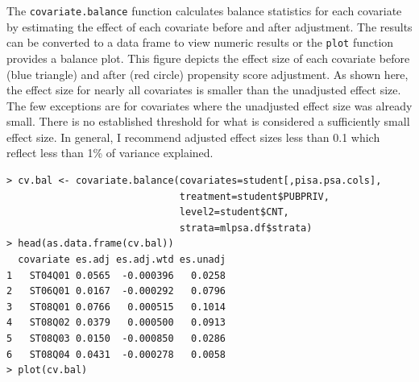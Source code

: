 \documentclass[letterpaper,12pt]{article} %
\begin{document}
The \texttt{covariate.balance} function calculates balance statistics for each covariate by estimating the effect of each covariate before and after adjustment. The results can be converted to a data frame to view numeric results or the \texttt{plot} function provides a balance plot. This figure depicts the effect size of each covariate before (blue triangle) and after (red circle) propensity score adjustment. As shown here, the effect size for nearly all covariates is smaller than the unadjusted effect size. The few exceptions are for covariates where the unadjusted effect size was already small. There is no established threshold for what is considered a sufficiently small effect size. In general, I recommend adjusted effect sizes less than 0.1 which reflect less than 1\% of variance explained.

\begin{verbatim}
> cv.bal <- covariate.balance(covariates=student[,pisa.psa.cols],
                              treatment=student$PUBPRIV,
                              level2=student$CNT,
                              strata=mlpsa.df$strata)
> head(as.data.frame(cv.bal))
  covariate es.adj es.adj.wtd es.unadj
1   ST04Q01 0.0565  -0.000396   0.0258
2   ST06Q01 0.0167  -0.000292   0.0796
3   ST08Q01 0.0766   0.000515   0.1014
4   ST08Q02 0.0379   0.000500   0.0913
5   ST08Q03 0.0150  -0.000850   0.0286
6   ST08Q04 0.0431  -0.000278   0.0058
> plot(cv.bal)
\end{verbatim}
\end{document}
